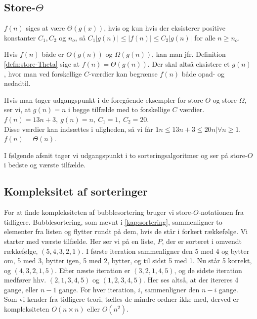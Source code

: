 \subsection{Store-$\Theta$}
\begin{defn} \label{defn:store-Theta}
$f(n)$ siges at være $\Theta(g(x))$, hvis og kun hvis der eksisterer positive konstanter $C_1, C_2$ og $n_o$, så $C_1|g(n)| \leq |f(n)| \leq C_2|g(n)|$ for alle $n \geq n_o$.
\end{defn}
Hvis $f(n)$ både er $O(g(n))$ og $\Omega(g(n))$, kan man jfr. Definition \ref{defn:store-Theta} sige at $f(n) = \Theta(g(n))$. 
Der skal altså eksistere et $g(n)$, hvor man ved forskellige $C$-værdier kan begrænse $f(n)$ både opad- og nedadtil. 
\begin{exmp}
Hvis man tager udgangspunkt i de foregående eksempler for store-$O$ og store-$\Omega$, ser vi, at $g(n) = n$ i begge tilfælde med to forskellige $C$ værdier. \\
$f(n)=13n+3, \ g(n)=n, \ C_1=1, \ C_2=20$. \\
Disse værdier kan indsættes i uligheden, så vi får $1n \leq 13n+3 \leq 20n| \forall n \geq 1$. \\
$f(n)= \Theta(n)$.
\end{exmp}

I følgende afsnit tager vi udgangspunkt i to sorteringsalgoritmer og ser på store-$O$ i bedste og værste tilfælde.

\subsection{Kompleksitet af sorteringer} \label{kap:kompleksitet_sortering}

For at finde kompleksiteten af bubblesortering bruger vi store-$O$-notationen fra tidligere. 
Bubblesortering, som nævnt i \autoref{kap:sortering}, sammenligner to elementer fra listen og flytter rundt på dem, hvis de står i forkert rækkefølge.
Vi starter med værste tilfælde. Her ser vi på en liste, $P$, der er sorteret i omvendt rækkefølge, $(5,4,3,2,1)$.
I første iteration sammenligner den 5 med 4 og bytter om, 5 med 3, bytter igen, 5 med 2, bytter, og til sidst 5 med 1. Nu står 5 korrekt, og $(4, 3, 2, 1, 5)$.
Efter næste iteration er $(3, 2, 1, 4, 5)$, og de sidste iteration medfører hhv. $(2, 1, 3, 4, 5)$ og $(1, 2, 3, 4, 5)$. Her ses altså, at der itereres 4 gange, eller $n-1$ gange. 
For hver iteration, $i$, sammenligner den $n-i$ gange. 
Som vi kender fra tidligere teori, tælles de mindre ordner ikke med, derved er kompleksiteten $O(n\times n)$ eller $O(n^2)$.


